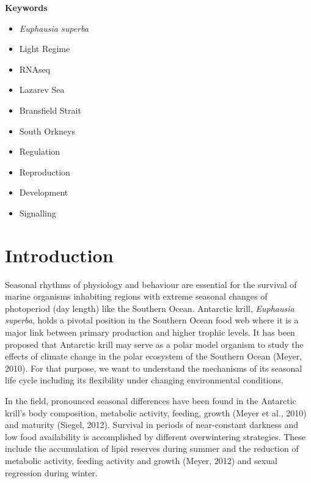 \textbf{Keywords}
\begin{itemize}
    \item \textit{Euphausia superba}
    \item Light Regime
    \item RNAseq
    \item Lazarev Sea
    \item Bransfield Strait
    \item South Orkneys
    \item Regulation
    \item Reproduction
    \item Development
    \item Signalling
\end{itemize}

\section{Introduction}

Seasonal rhythms of physiology and behaviour are essential for the survival of marine organisms inhabiting regions with extreme seasonal changes of photoperiod (day length) like the Southern Ocean. Antarctic krill, \textit{Euphausia superba}, holds a pivotal position in the Southern Ocean food web where it is a major link between primary production and higher trophic levels. It has been proposed that Antarctic krill may serve as a polar model organism to study the effects of climate change in the polar ecosystem of the Southern Ocean (Meyer, 2010). For that purpose, we want to understand the mechanisms of its seasonal life cycle including its flexibility under changing environmental conditions.

In the field, pronounced seasonal differences have been found in the Antarctic krill's body composition, metabolic activity, feeding, growth (Meyer et al., 2010) and maturity (Siegel, 2012). Survival in periods of near-constant darkness and low food availability is accomplished by different overwintering strategies. These include the accumulation of lipid reserves during summer and the reduction of metabolic activity, feeding activity and growth (Meyer, 2012) and sexual regression during winter.

